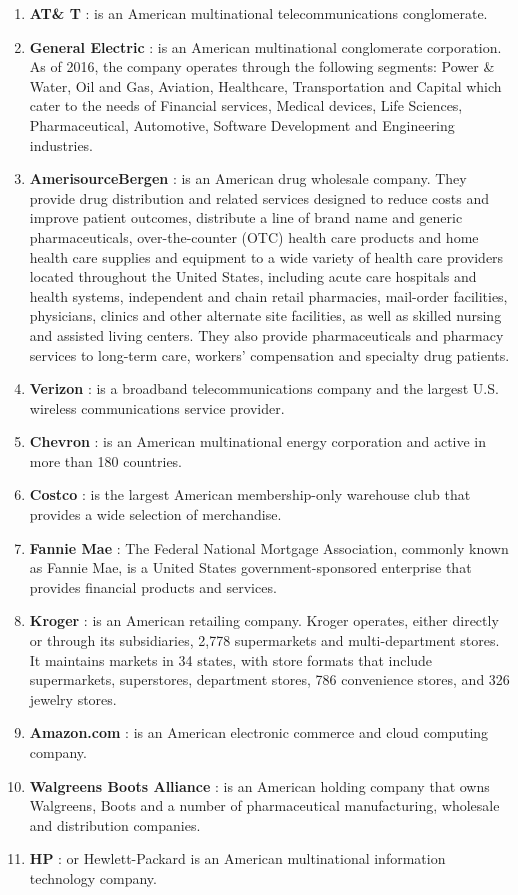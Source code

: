 \documentclass{book}
\begin{document}
\begin{enumerate}
\item \textbf{AT\& T } :  is an American multinational telecommunications conglomerate.
\item \textbf{General Electric }: is an American multinational conglomerate corporation. As of 2016, the company operates through the following segments: Power \& Water, Oil and Gas, Aviation, Healthcare, Transportation and Capital which cater to the needs of Financial services, Medical devices, Life Sciences, Pharmaceutical, Automotive, Software Development and Engineering industries.
\item \textbf{AmerisourceBergen } :  is an American drug wholesale company. They provide drug distribution and related services designed to reduce costs and improve patient outcomes, distribute a line of brand name and generic pharmaceuticals, over-the-counter (OTC) health care products and home health care supplies and equipment to a wide variety of health care providers located throughout the United States, including acute care hospitals and health systems, independent and chain retail pharmacies, mail-order facilities, physicians, clinics and other alternate site facilities, as well as skilled nursing and assisted living centers. They also provide pharmaceuticals and pharmacy services to long-term care, workers' compensation and specialty drug patients.
\item \textbf{Verizon } :  is a broadband telecommunications company and the largest U.S. wireless communications service provider.
\item \textbf{Chevron } :  is an American multinational energy corporation and active in more than 180 countries.
\item \textbf{Costco } :  is the largest American membership-only warehouse club that provides a wide selection of merchandise.
\item \textbf{Fannie Mae } : The Federal National Mortgage Association, commonly known as Fannie Mae, is a United States government-sponsored enterprise that provides financial products and services.
\item \textbf{Kroger } :  is an American retailing company. Kroger operates, either directly or through its subsidiaries, 2,778 supermarkets and multi-department stores. It maintains markets in 34 states, with store formats that include supermarkets, superstores, department stores, 786 convenience stores, and 326 jewelry stores.
\item \textbf{Amazon.com } :  is an American electronic commerce and cloud computing company.
\item \textbf{Walgreens Boots Alliance } :  is an American holding company that owns Walgreens, Boots and a number of pharmaceutical manufacturing, wholesale and distribution companies. 
\item \textbf{HP }: or Hewlett-Packard is an American multinational information technology company.
\end{enumerate}
\end{document}

